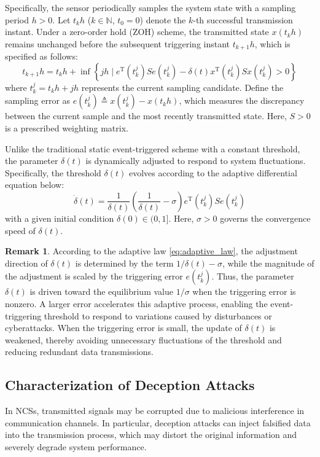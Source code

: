 \documentclass[preprint,review,fleqn,sort&compress,3p]{elsarticle}
\theoremstyle{definition} %
\theoremstyle{definition}%
\newtheorem{rem}{Remark}[section]
\begin{document}
Specifically, the sensor periodically samples the system state with a sampling period $h>0$. Let $t_kh$ ($k \in \mathbb{N}$, $t_0 = 0$) denote the $k$-th successful transmission instant. Under a zero-order hold (ZOH) scheme, the transmitted state $x(t_k h)$ remains unchanged before the subsequent triggering instant $t_{k+1}h$, which is specified as follows:
\begin{equation} \label{eq:Event_TR_1}
	t_{k+1}h = t_k h + \inf \left\{ jh \mid e^{\mathrm{T}}(t^j_{k}) S e(t^j_{k}) - \delta(t) x^{\mathrm{T}}(t_{k}^j) S x(t_{k}^j) > 0 \right\}
\end{equation}
where $t_k^j=t_kh+jh$ represents the current sampling candidate.
Define the sampling error as
$e(t_k^j)\triangleq x(t_k^j)-x(t_kh)$, which measures the discrepancy between the current sample and the most recently transmitted state.
Here, $S>0$ is a prescribed weighting matrix.

Unlike the traditional static event-triggered scheme with a constant threshold, the parameter $\delta(t)$ is dynamically adjusted to respond to system fluctuations. Specifically, the threshold $\delta(t)$ evolves according to the adaptive differential equation below:
\begin{equation} \label{eq:adaptive_law}
	\dot{\delta}(t) = \frac{1}{\delta(t)} \left( \frac{1}{\delta(t)} - \sigma \right) e^{\mathrm{T}}(t^j_{k}) S e(t^j_{k})
\end{equation}
with a given initial condition $\delta(0) \in (0, 1]$. Here, $\sigma>0$ governs the convergence speed of $\delta(t)$.

\begin{rem}
	According to the adaptive law \eqref{eq:adaptive_law}, the adjustment direction of $\delta(t)$ is determined by the term $1/\delta(t)-\sigma$, while the magnitude of the adjustment is scaled by the triggering error $e(t^j_k)$. Thus, the parameter $\delta(t)$ is driven toward the equilibrium value $1/\sigma$ when the triggering error is nonzero. A larger error accelerates this adaptive process, enabling the event-triggering threshold to respond to variations caused by disturbances or cyberattacks. When the triggering error is small, the update of $\delta(t)$ is weakened, thereby avoiding unnecessary fluctuations of the threshold and reducing redundant data transmissions.
\end{rem}

\subsection{Characterization of Deception Attacks}\label{sec2.3}
In NCSs, transmitted signals may be corrupted due to malicious interference in communication channels. In particular, deception attacks can inject falsified data into the transmission process, which may distort the original information and severely degrade system performance.
\end{document}
